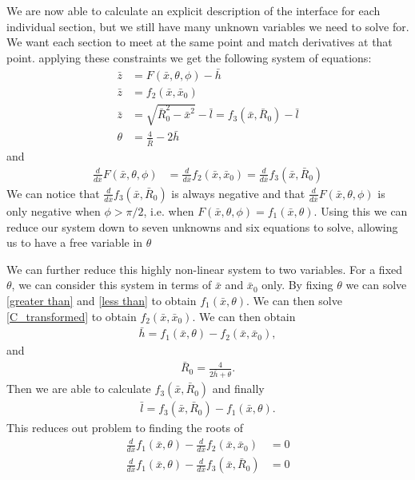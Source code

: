 We are now able to calculate an explicit description of the interface for each individual section, but we still have many unknown variables we need to solve for. We want each section to meet at the same point and match derivatives at that point. applying these constraints we get the following system of equations:
\begin{align}
    \bar{z}&=F(\bar{x},\theta,\phi) - \bar{h} \\
    \bar{z}&=f_2(\bar{x},\bar{x}_0) \\
    \bar{z}&=\sqrt{\bar{R}_0^2-\bar{x}^2} - \bar{l}=f_3(\bar{x},\bar{R}_0)-\bar{l} \\
    \theta&=\frac{4}{\bar{R}}-2\bar{h}
\end{align}
and
\begin{align}
    \frac{d}{d\bar{x}}F(\bar{x},\theta,\phi)&=\frac{d}{d\bar{x}}f_2(\bar{x},\bar{x}_0) = \frac{d}{d\bar{x}}f_3(\bar{x},\bar{R}_0)
\end{align}
We can notice that $\frac{d}{d\bar{x}}f_3(\bar{x},\bar{R}_0)$ is always negative and that $\frac{d}{d\bar{x}}F(\bar{x},\theta,\phi)$ is only negative when $\phi>\pi/2$, i.e. when $F(\bar{x},\theta,\phi)=f_1(\bar{x},\theta)$. Using this we can reduce our system down to seven unknowns and six equations to solve, allowing us to have a free variable in $\theta$

We can further reduce this highly non-linear system to two variables. For a fixed $\theta$, we can consider this system in terms of $\bar{x}$ and $\bar{x}_0$ only. By fixing $\theta$ we can solve \ref{greater than} and \ref{less than} to obtain $f_1(\bar{x},\theta)$. We can then solve \ref{C_transformed} to obtain $f_2(\bar{x},\bar{x}_0)$. We can then obtain
\begin{align}
    \bar{h} = f_1(\bar{x},\theta) - f_2(\bar{x},\bar{x}_0),
\end{align}
and
\begin{align}
    \bar{R}_0=\frac{4}{2\bar{h} + \theta}.
\end{align}
Then we are able to calculate $f_3(\bar{x},\bar{R}_0)$ and finally
\begin{align}
    \bar{l} = f_3(\bar{x},\bar{R}_0)-f_1(\bar{x},\theta).
\end{align}
This reduces out problem to finding the roots of
\begin{align}\label{root 1}
    \frac{d}{d\bar{x}}f_1(\bar{x},\theta) -\frac{d}{d\bar{x}}f_2(\bar{x},\bar{x}_0) &=0 \\ \label{root 2}
    \frac{d}{d\bar{x}}f_1(\bar{x},\theta) - \frac{d}{d\bar{x}}f_3(\bar{x},\bar{R}_0) &=0
\end{align}
